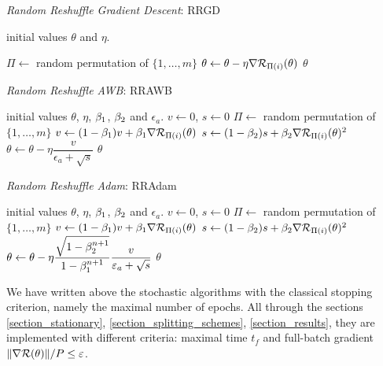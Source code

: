 \begin{algorithm}[h!]
	\caption{{\it Random Reshuffle Gradient Descent}: RRGD}
	\begin{algorithmic}
		\REQUIRE initial values $\theta$ and $\eta$.
		
		\STATE $\Pi \leftarrow$ random permutation of $\{1,\dots,m\}$
		\STATE $\theta \leftarrow \theta-\eta \nabla \mathcal{R}_{\Pi(i)}(\theta)$
		\ENDFOR
		\ENDFOR
		\RETURN $\theta$
	\end{algorithmic}
	\label{algo_RRGD}
\end{algorithm} 

\begin{algorithm}[h!]
	\caption{{\it Random Reshuffle AWB}: RRAWB}
	\begin{algorithmic}
		\REQUIRE initial values $\theta$, $\eta$, $\beta_1$, $\beta_2$ and $\epsilon_a$.
		\STATE $v\leftarrow 0$, $s\leftarrow 0$
		\FOR{$n=0, \dots, n_{max}-1$}
		\STATE $\Pi \leftarrow$ random permutation of $\{1,\dots,m\}$
		\FOR{$i=1, \dots, m$}
		\STATE $v \leftarrow(1-\beta_1)v + \beta_1 \nabla \mathcal{R}_{\Pi(i)}(\theta)$
		\STATE $s \leftarrow (1-\beta_2)s + \beta_2 \nabla \mathcal{R}_{\Pi(i)}(\theta)^2$
		\STATE $\theta \leftarrow \theta -\eta \dfrac{v}{\epsilon_a+\sqrt{s}}$
		\ENDFOR
		\ENDFOR
		\RETURN $\theta$
	\end{algorithmic}
	\label{algo_RRAWB}
\end{algorithm} 

\begin{algorithm}[h!]
	\caption{{\it Random Reshuffle Adam}: RRAdam}
	\begin{algorithmic}
		\REQUIRE initial values $\theta$, $\eta$, $\beta_1$, $\beta_2$ and $\epsilon_a$.
		\STATE $v\leftarrow 0$, $s\leftarrow 0$
		\STATE $\Pi \leftarrow$ random permutation of $\{1,\dots,m\}$
		\STATE $v \leftarrow(1-\beta_1)v + \beta_1 \nabla \mathcal{R}_{\Pi(i)}(\theta)$
		\STATE $s \leftarrow (1-\beta_2)s + \beta_2 \nabla \mathcal{R}_{\Pi(i)}(\theta)^2$
		\STATE $\theta \leftarrow \theta -\eta \dfrac{\sqrt{1-\beta_2^{n+1}}}{1-\beta_1^{n+1}} \dfrac{v}{\varepsilon_a+\sqrt{s}}$
		\ENDFOR
		\ENDFOR
		\RETURN $\theta$
	\end{algorithmic}
	\label{algo_RRAdam}
\end{algorithm} 

\begin{remark}
	We have written above the stochastic algorithms with the classical stopping criterion, namely the maximal number of epochs. All through the sections \ref{section_stationary}, \ref{section_splitting_schemes}, \ref{section_results}, they are implemented with different criteria: maximal time $t_f$ and full-batch gradient $\|\nabla \mathcal{R}(\theta)\|/P \leq \varepsilon$.
\end{remark}


\clearpage





